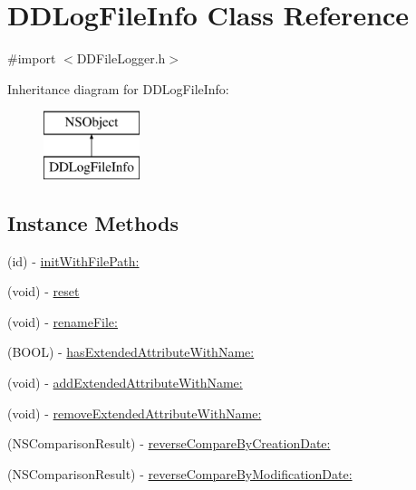 \hypertarget{interface_d_d_log_file_info}{\section{D\-D\-Log\-File\-Info Class Reference}
\label{interface_d_d_log_file_info}
}


{\ttfamily \#import $<$D\-D\-File\-Logger.\-h$>$}

Inheritance diagram for D\-D\-Log\-File\-Info\-:\begin{figure}[H]
\begin{center}
\leavevmode
\includegraphics[height=2.000000cm]{interface_d_d_log_file_info}
\end{center}
\end{figure}
\subsection*{Instance Methods}
\begin{DoxyCompactItemize}
\item 
(id) -\/ \hyperlink{interface_d_d_log_file_info_a666e85ad296bffbdc7664218cbd5cc39}{init\-With\-File\-Path\-:}
\item 
(void) -\/ \hyperlink{interface_d_d_log_file_info_ad79ccc84e66ee6c8c0c4e9257100aa9c}{reset}
\item 
(void) -\/ \hyperlink{interface_d_d_log_file_info_af1a4adde6bb938bad3f106b475874cc5}{rename\-File\-:}
\item 
(B\-O\-O\-L) -\/ \hyperlink{interface_d_d_log_file_info_a42cdbf5862a180e583eb8aec911a3cc3}{has\-Extended\-Attribute\-With\-Name\-:}
\item 
(void) -\/ \hyperlink{interface_d_d_log_file_info_a7d08e4eb256d725bf09386429e66f0e4}{add\-Extended\-Attribute\-With\-Name\-:}
\item 
(void) -\/ \hyperlink{interface_d_d_log_file_info_a6a24e724c304a7cbef313719246bfed0}{remove\-Extended\-Attribute\-With\-Name\-:}
\item 
(N\-S\-Comparison\-Result) -\/ \hyperlink{interface_d_d_log_file_info_ac5cc1dd100bd1d6e441a4f0d29337b7b}{reverse\-Compare\-By\-Creation\-Date\-:}
\item 
(N\-S\-Comparison\-Result) -\/ \hyperlink{interface_d_d_log_file_info_aaf303c6da71fd94050e3d37918d3863c}{reverse\-Compare\-By\-Modification\-Date\-:}
\end{DoxyCompactItemize}
